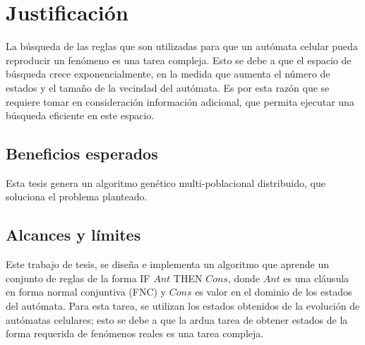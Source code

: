 \section{Justificación}
La búsqueda de las reglas que son utilizadas para que un autómata celular pueda reproducir un fenómeno es una tarea compleja. Esto se debe a que el espacio de búsqueda crece exponencialmente, en la medida que aumenta el
número de estados y el tamaño de la vecindad del autómata. Es por esta razón que se requiere tomar en consideración información adicional, que permita ejecutar una búsqueda eficiente en este espacio.

\subsection{Beneficios esperados}
Esta tesis genera un algoritmo genético multi-poblacional distribuido, que soluciona el problema planteado.

\subsection{Alcances y límites}
Este trabajo de tesis, se diseña e implementa un algoritmo que aprende un conjunto de reglas de la forma IF $Ant$ THEN $Cons$, donde $Ant$ es una cláusula en forma normal conjuntiva (FNC) y $Cons$ es valor en el dominio de los estados del autómata. Para esta tarea, se utilizan los estados obtenidos de la evolución de autómatas celulares; esto se debe a que la ardua tarea de obtener estados de la forma requerida de fenómenos reales es una tarea compleja.

